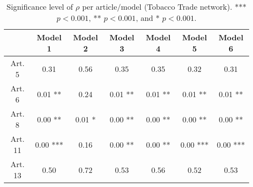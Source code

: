 \begin{table}[ht]
\centering
\begin{tabular}{ccccccc}
  \toprule
 & Model 1 & Model 2 & Model 3 & Model 4 & Model 5 & Model 6 \\ 
  \midrule
Art. 5 & 0.31   & 0.56   & 0.35   & 0.35   & 0.32   & 0.31   \\ 
   \midrule
Art. 6 & 0.01 ** & 0.24   & 0.01 ** & 0.01 ** & 0.01 ** & 0.01 ** \\ 
   \midrule
Art. 8 & 0.00 ** & 0.01 * & 0.00 ** & 0.00 ** & 0.00 ** & 0.00 ** \\ 
   \midrule
Art. 11 & 0.00 *** & 0.16   & 0.00 ** & 0.00 ** & 0.00 *** & 0.00 *** \\ 
   \midrule
Art. 13 & 0.50   & 0.72   & 0.53   & 0.56   & 0.52   & 0.53   \\ 
   \bottomrule
\end{tabular}
\caption{Significance level of $\rho$ per article/model (Tobacco Trade network). *** $p < 0.001$, ** $p < 0.001$, and * $p < 0.001$.} 
\end{table}
